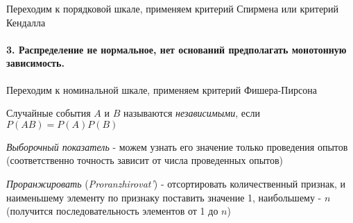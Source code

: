\documentclass[12pt]{extarticle}
\begin{document}
Переходим к порядковой шкале, применяем критерий Спирмена или критерий
Кендалла

\paragraph{3. Распределение не нормальное, нет оснований предполагать
монотонную зависимость.}

Переходим к номинальной шкале, применяем критерий Фишера-Пирсона

\par Случайные события $A$ и $B$ называются
\textit{независимыми}, если
$P(AB)=P(A)P(B)$

\par \textit{Выборочный показатель} - можем узнать
его значение только проведения опытов (соответственно точность зависит от
числа проведенных опытов)

\par \textit{Проранжировать}
(\textit{Proranzhirovat'}) -
отсортировать количественный признак, и наименьшему элементу по признаку
поставить значение 1, наибольшему - $n$ (получится последовательность
элементов от 1 до $n$)
\end{document}
